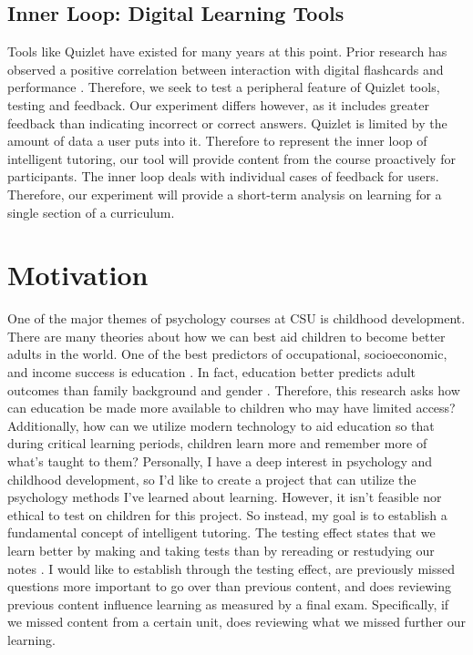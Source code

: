 \documentclass[acmtog]{acmart}
\begin{document}
\subsection{Inner Loop: Digital Learning Tools}
Tools like Quizlet have existed for many years at this point. Prior research has observed a positive correlation between interaction with digital flashcards and performance \cite{yuksel2020digital}. Therefore, we seek to test a peripheral feature of Quizlet tools, testing and feedback. Our experiment differs however, as it includes greater feedback than indicating incorrect or correct answers. Quizlet is limited by the amount of data a user puts into it. Therefore to represent the inner loop of intelligent tutoring, our tool will provide content from the course proactively for participants. The inner loop deals with individual cases of feedback for users. Therefore, our experiment will provide a short-term analysis on learning for a single section of a curriculum.  
\section{Motivation}
One of the major themes of psychology courses at CSU is childhood development. There are many theories about how we can best aid children to become better adults in the world. One of the best predictors of occupational, socioeconomic, and income success is education \cite{becker2019childhood}. In fact, education better predicts adult outcomes than family background and gender \cite{becker2019childhood}. Therefore, this research asks how can education be made more available to children who may have limited access? Additionally, how can we utilize modern technology to aid education so that during critical learning periods, children learn more and remember more of what’s taught to them? Personally, I have a deep interest in psychology and childhood development, so I’d like to create a project that can utilize the psychology methods I’ve learned about learning. However, it isn't feasible nor ethical to test on children for this project. So instead, my goal is to establish a fundamental concept of intelligent tutoring. The testing effect states that we learn better by making and taking tests than by rereading or restudying our notes \cite{su2021levels}. I would like to establish through the testing effect, are previously missed questions more important to go over than previous content, and does reviewing previous content influence learning as measured by a final exam. Specifically, if we missed content from a certain unit, does reviewing what we missed further our learning.
\end{document}
